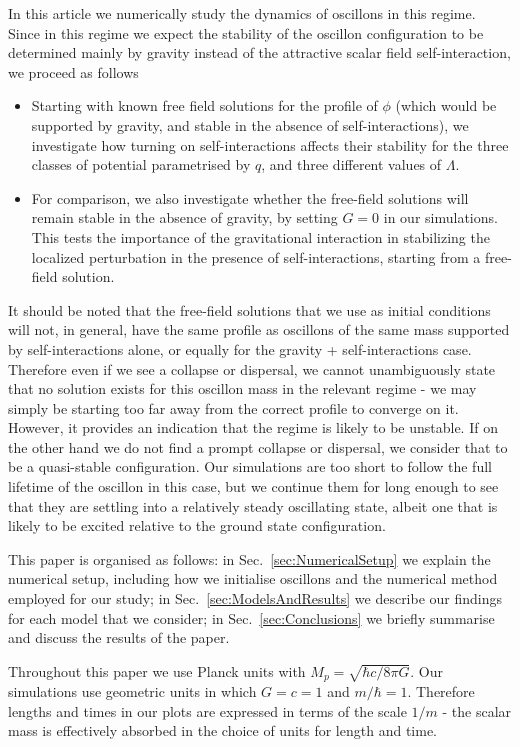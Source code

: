 \documentclass[11pt,a4paper]{article}
\begin{document}
In this article we numerically study the dynamics of oscillons in this regime. Since in this regime we expect the stability of the oscillon configuration to be determined mainly by gravity instead of the attractive scalar field self-interaction, we proceed as follows
\begin{itemize}
\item Starting with known free field solutions for the profile of $\phi$ (which would be supported by gravity, and stable in the absence of self-interactions), we investigate how turning on self-interactions affects their stability for the three classes of potential parametrised by $q$, and three different values of $\Lambda$.
\item For comparison, we also investigate whether the free-field solutions will remain stable in the absence of gravity, by setting $G=0$ in our simulations. This tests the importance of the gravitational interaction in stabilizing the localized perturbation in the presence of self-interactions, starting from a free-field solution.
\end{itemize}
It should be noted that the free-field solutions that we use as initial conditions will not, in general, have the same profile as oscillons of the same mass supported by self-interactions alone, or equally for the gravity + self-interactions case. Therefore even if we see a collapse or dispersal, we cannot unambiguously state that no solution exists for this oscillon mass in the relevant regime - we may simply be starting too far away from the correct profile to converge on it. However, it provides an indication that the regime is likely to be unstable. If on the other hand we do not find a prompt collapse or dispersal, we consider that to be a quasi-stable configuration. Our simulations are too short to follow the full lifetime of the oscillon in this case, but we continue them for long enough to see that they are settling into a relatively steady oscillating state, albeit one that is likely to be excited relative to the ground state configuration.

This paper is organised as follows: in Sec.~\ref{sec:NumericalSetup} we explain the numerical setup, including how we initialise oscillons and the numerical method employed for our study; in Sec.~\ref{sec:ModelsAndResults} we describe our findings for each model that we consider; in Sec.~\ref{sec:Conclusions} we briefly summarise and discuss the results of the paper.

Throughout this paper we use Planck units with $M_p = \sqrt{\hbar c/8\pi G}$. Our simulations use geometric units in which $G=c=1$ and $m/\hbar = 1$. Therefore lengths and times in our plots are expressed in terms of the scale $1/m$ - the scalar mass is effectively absorbed in the choice of units for length and time.
\end{document}
